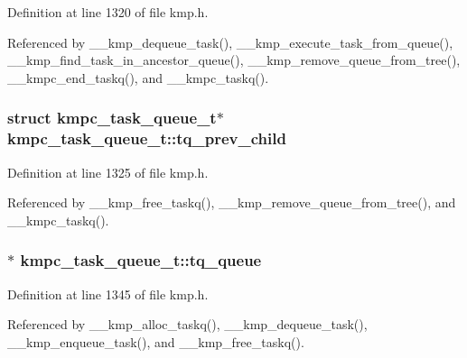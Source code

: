 Definition at line 1320 of file kmp.\-h.



Referenced by \-\_\-\-\_\-kmp\-\_\-dequeue\-\_\-task(), \-\_\-\-\_\-kmp\-\_\-execute\-\_\-task\-\_\-from\-\_\-queue(), \-\_\-\-\_\-kmp\-\_\-find\-\_\-task\-\_\-in\-\_\-ancestor\-\_\-queue(), \-\_\-\-\_\-kmp\-\_\-remove\-\_\-queue\-\_\-from\-\_\-tree(), \-\_\-\-\_\-kmpc\-\_\-end\-\_\-taskq(), and \-\_\-\-\_\-kmpc\-\_\-taskq().

\hypertarget{structkmpc__task__queue__t_ab120e6e740ddd5e3de6e1df41c43b774}{
\subsubsection[{tq\-\_\-prev\-\_\-child}]{\setlength{\rightskip}{0pt plus 5cm}struct {\bf kmpc\-\_\-task\-\_\-queue\-\_\-t}$\ast$ kmpc\-\_\-task\-\_\-queue\-\_\-t\-::tq\-\_\-prev\-\_\-child}}\label{structkmpc__task__queue__t_ab120e6e740ddd5e3de6e1df41c43b774}


Definition at line 1325 of file kmp.\-h.



Referenced by \-\_\-\-\_\-kmp\-\_\-free\-\_\-taskq(), \-\_\-\-\_\-kmp\-\_\-remove\-\_\-queue\-\_\-from\-\_\-tree(), and \-\_\-\-\_\-kmpc\-\_\-taskq().

\hypertarget{structkmpc__task__queue__t_a6db62429603a5a619eddd61a3734704b}{
\subsubsection[{tq\-\_\-queue}]{$\ast$ kmpc\-\_\-task\-\_\-queue\-\_\-t\-::tq\-\_\-queue}}\label{structkmpc__task__queue__t_a6db62429603a5a619eddd61a3734704b}


Definition at line 1345 of file kmp.\-h.



Referenced by \-\_\-\-\_\-kmp\-\_\-alloc\-\_\-taskq(), \-\_\-\-\_\-kmp\-\_\-dequeue\-\_\-task(), \-\_\-\-\_\-kmp\-\_\-enqueue\-\_\-task(), and \-\_\-\-\_\-kmp\-\_\-free\-\_\-taskq().

